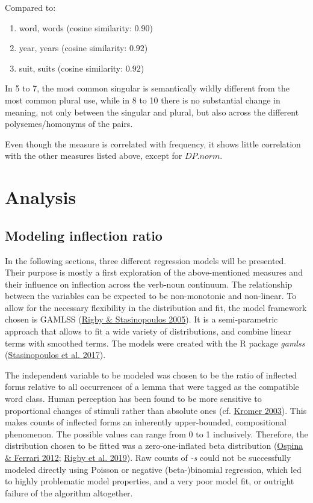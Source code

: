 \documentclass[
]{article}
\providecommand{\tightlist}{%
  \setlength{\itemsep}{0pt}\setlength{\parskip}{0pt}}
\begin{document}
Compared to:

\begin{enumerate}
\def\labelenumi{(\arabic{enumi})}
\setcounter{enumi}{7}
\tightlist
\item
  word, words (cosine similarity: \(0.90\))
\item
  year, years (cosine similarity: \(0.92\))
\item
  suit, suits (cosine similarity: \(0.92\))
\end{enumerate}

In 5 to 7, the most common singular is semantically wildly different
from the most common plural use, while in 8 to 10 there is no
substantial change in meaning, not only between the singular and plural,
but also across the different polysemes/homonyms of the pairs.

Even though the measure is correlated with frequency, it shows little
correlation with the other measures listed above, except for
\(DP.norm\).

\hypertarget{analys}{%
\section{Analysis}\label{analys}}

\hypertarget{modeling-inflection-ratio}{%
\subsection{Modeling inflection ratio}\label{modeling-inflection-ratio}}

In the following sections, three different regression models will be
presented. Their purpose is mostly a first exploration of the
above-mentioned measures and their influence on inflection across the
verb-noun continuum. The relationship between the variables can be
expected to be non-monotonic and non-linear. To allow for the necessary
flexibility in the distribution and fit, the model framework chosen is
GAMLSS (\protect\hyperlink{ref-gamlss}{Rigby \& Stasinopoulos 2005}). It
is a semi-parametric approach that allows to fit a wide variety of
distributions, and combine linear terms with smoothed terms. The models
were created with the R package \emph{gamlss}
(\protect\hyperlink{ref-stasinopoulos17}{Stasinopoulos et al. 2017}).

The independent variable to be modeled was chosen to be the ratio of
inflected forms relative to all occurrences of a lemma that were tagged
as the compatible word class. Human perception has been found to be more
sensitive to proportional changes of stimuli rather than absolute ones
(cf. \protect\hyperlink{ref-kromer03}{Kromer 2003}). This makes counts
of inflected forms an inherently upper-bounded, compositional
phenomenon. The possible values can range from 0 to 1 inclusively.
Therefore, the distribution chosen to be fitted was a zero-one-inflated
beta distribution (\protect\hyperlink{ref-ospina+ferrari12}{Ospina \&
Ferrari 2012}; \protect\hyperlink{ref-rigby19}{Rigby et al. 2019}). Raw
counts of \emph{-s} could not be successfully modeled directly using
Poisson or negative (beta-)binomial regression, which led to highly
problematic model properties, and a very poor model fit, or outright
failure of the algorithm altogether.
\end{document}
